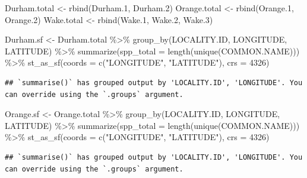 \documentclass[
  12pt,
]{article}
\newenvironment{Shaded}{\begin{snugshade}}{\end{snugshade}}
\newcommand{\AttributeTok}[1]{\textcolor[rgb]{0.77,0.63,0.00}{#1}}
\newcommand{\DecValTok}[1]{\textcolor[rgb]{0.00,0.00,0.81}{#1}}
\newcommand{\FloatTok}[1]{\textcolor[rgb]{0.00,0.00,0.81}{#1}}
\newcommand{\FunctionTok}[1]{\textcolor[rgb]{0.00,0.00,0.00}{#1}}
\newcommand{\NormalTok}[1]{#1}
\newcommand{\OtherTok}[1]{\textcolor[rgb]{0.56,0.35,0.01}{#1}}
\newcommand{\SpecialCharTok}[1]{\textcolor[rgb]{0.00,0.00,0.00}{#1}}
\newcommand{\StringTok}[1]{\textcolor[rgb]{0.31,0.60,0.02}{#1}}
\begin{document}
\begin{Shaded}
\begin{Highlighting}[]
\NormalTok{Durham.total }\OtherTok{\textless{}{-}} \FunctionTok{rbind}\NormalTok{(Durham}\FloatTok{.1}\NormalTok{, Durham}\FloatTok{.2}\NormalTok{)}
\NormalTok{Orange.total }\OtherTok{\textless{}{-}} \FunctionTok{rbind}\NormalTok{(Orange}\FloatTok{.1}\NormalTok{, Orange}\FloatTok{.2}\NormalTok{)}
\NormalTok{Wake.total }\OtherTok{\textless{}{-}} \FunctionTok{rbind}\NormalTok{(Wake}\FloatTok{.1}\NormalTok{, Wake}\FloatTok{.2}\NormalTok{, Wake}\FloatTok{.3}\NormalTok{)}

\NormalTok{Durham.sf }\OtherTok{\textless{}{-}}\NormalTok{ Durham.total }\SpecialCharTok{\%\textgreater{}\%}
  \FunctionTok{group\_by}\NormalTok{(LOCALITY.ID, LONGITUDE, LATITUDE) }\SpecialCharTok{\%\textgreater{}\%}
  \FunctionTok{summarize}\NormalTok{(}\AttributeTok{spp\_total =} \FunctionTok{length}\NormalTok{(}\FunctionTok{unique}\NormalTok{(COMMON.NAME))) }\SpecialCharTok{\%\textgreater{}\%}
  \FunctionTok{st\_as\_sf}\NormalTok{(}\AttributeTok{coords =} \FunctionTok{c}\NormalTok{(}\StringTok{"LONGITUDE"}\NormalTok{, }\StringTok{"LATITUDE"}\NormalTok{), }\AttributeTok{crs =} \DecValTok{4326}\NormalTok{)}
\end{Highlighting}
\end{Shaded}

\begin{verbatim}
## `summarise()` has grouped output by 'LOCALITY.ID', 'LONGITUDE'. You can override using the `.groups` argument.
\end{verbatim}

\begin{Shaded}
\begin{Highlighting}[]
\NormalTok{Orange.sf }\OtherTok{\textless{}{-}}\NormalTok{ Orange.total }\SpecialCharTok{\%\textgreater{}\%}
  \FunctionTok{group\_by}\NormalTok{(LOCALITY.ID, LONGITUDE, LATITUDE) }\SpecialCharTok{\%\textgreater{}\%}
  \FunctionTok{summarize}\NormalTok{(}\AttributeTok{spp\_total =} \FunctionTok{length}\NormalTok{(}\FunctionTok{unique}\NormalTok{(COMMON.NAME))) }\SpecialCharTok{\%\textgreater{}\%}
  \FunctionTok{st\_as\_sf}\NormalTok{(}\AttributeTok{coords =} \FunctionTok{c}\NormalTok{(}\StringTok{"LONGITUDE"}\NormalTok{, }\StringTok{"LATITUDE"}\NormalTok{), }\AttributeTok{crs =} \DecValTok{4326}\NormalTok{)}
\end{Highlighting}
\end{Shaded}

\begin{verbatim}
## `summarise()` has grouped output by 'LOCALITY.ID', 'LONGITUDE'. You can override using the `.groups` argument.
\end{verbatim}
\end{document}
